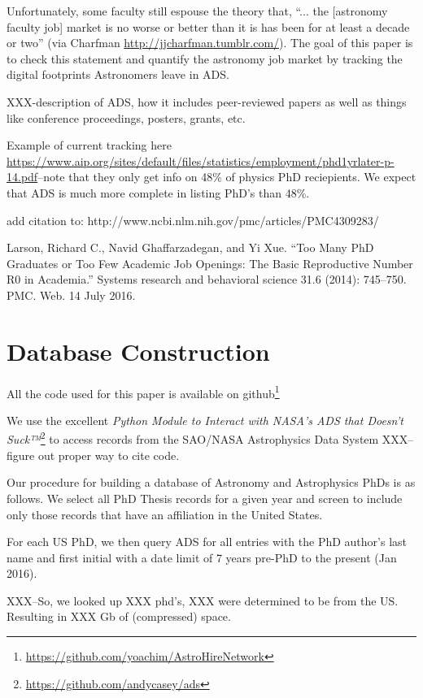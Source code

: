\documentclass{emulateapj}
\begin{document}
Unfortunately, some faculty still espouse the theory that, ``... the [astronomy faculty job] market is no worse or better than it is has been for at least a decade or two'' (via Charfman \url{http://jjcharfman.tumblr.com/}).  The goal of this paper is to check this statement and quantify the astronomy job market by tracking the digital footprints Astronomers leave in ADS. 

XXX-description of ADS, how it includes peer-reviewed papers as well as things like conference proceedings, posters, grants, etc.

Example of current tracking here \url{https://www.aip.org/sites/default/files/statistics/employment/phd1yrlater-p-14.pdf}--note that they only get info on 48\% of physics PhD reciepients.  We expect that ADS is much more complete in listing PhD's than 48\%.


add citation to: http://www.ncbi.nlm.nih.gov/pmc/articles/PMC4309283/

Larson, Richard C., Navid Ghaffarzadegan, and Yi Xue. “Too Many PhD Graduates or Too Few Academic Job Openings: The Basic Reproductive Number R0 in Academia.” Systems research and behavioral science 31.6 (2014): 745–750. PMC. Web. 14 July 2016.

\section{Database Construction}\label{sec:db_construct}

All the code used for this paper is available on github\footnote{\url{https://github.com/yoachim/AstroHireNetwork}}

We use the excellent {\emph{Python Module to Interact with NASA's ADS that Doesn't Suck™}}\footnote{\url{https://github.com/andycasey/ads}} to access records from the SAO/NASA Astrophysics Data System XXX--figure out proper way to cite code. 

Our procedure for building a database of Astronomy and Astrophysics PhDs is as follows.  We select all PhD Thesis records for a given year and screen to include only those records that have an affiliation in the United States.

For each US PhD, we then query ADS for all entries with the PhD author's last name and first initial with a date limit of 7 years pre-PhD to the present (Jan 2016).

XXX--So, we looked up XXX phd's, XXX were determined to be from the US. Resulting in XXX Gb of (compressed) space.  
\end{document}

